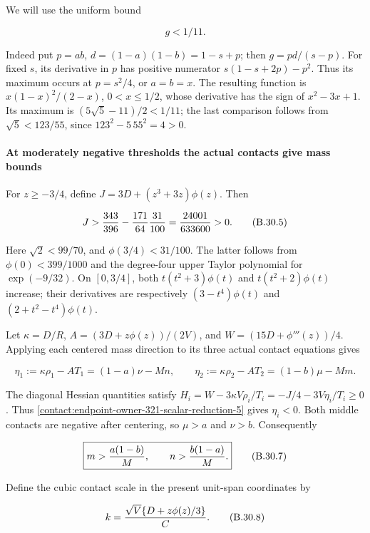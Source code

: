We will use the uniform bound

\[
 \boxed{g<1/11.}
\tag{B.30.4}\label{contact:endpoint-owner-321-scalar-reduction-4}
\]

Indeed put $p=ab$, $d=(1-a)(1-b)=1-s+p$; then $g=pd/(s-p)$.
For fixed $s$, its derivative in $p$ has positive numerator
$s(1-s+2p)-p^2$. Thus its maximum occurs at $p=s^2/4$, or $a=b=x$.
The resulting function is $x(1-x)^2/(2-x)$, $0<x\le 1/2$, whose derivative
has the sign of $x^2-3x+1$. Its maximum is
$(5\sqrt{5}-11)/2<1/11$; the last comparison follows from
$\sqrt{5}<123/55$, since $123^2-5\,55^2=4>0$.

\paragraph{At moderately negative thresholds the actual contacts give mass bounds}

For $z\ge -3/4$, define $J=3D+(z^3+3z)\phi(z)$. Then

\[
 J>{343\over396}-{171\over64}{31\over100}
 ={24001\over633600}>0.
\tag{B.30.5}\label{contact:endpoint-owner-321-scalar-reduction-5}
\]

Here $\sqrt{2}<99/70$, and $\phi(3/4)<31/100$. The latter follows from
$\phi(0)<399/1000$ and the degree-four upper Taylor polynomial for
$\exp(-9/32)$. On $[0,3/4]$, both
$t(t^2+3)\phi(t)$ and $t(t^2+2)\phi(t)$ increase; their derivatives are
respectively $(3-t^4)\phi(t)$ and $(2+t^2-t^4)\phi(t)$.

Let $\kappa=D/R$, $A=(3D+z\phi(z))/(2V)$, and
$W=(15D+\phi'''(z))/4$. Applying each centered mass direction to its three
actual contact equations gives

\[
 \eta_1:=\kappa\rho_1-AT_1=(1-a)\nu-Mn,
 \qquad
 \eta_2:=\kappa\rho_2-AT_2=(1-b)\mu-Mm.
\tag{B.30.6}\label{contact:endpoint-owner-321-scalar-reduction-6}
\]

The diagonal Hessian quantities satisfy
$H_i=W-3\kappa V \rho_i/T_i=-J/4-3V \eta_i/T_i\ge 0$.
Thus \eqref{contact:endpoint-owner-321-scalar-reduction-5} gives $\eta_i<0$. Both middle contacts are negative after centering,
so $\mu>a$ and $\nu>b$. Consequently

\[
 \boxed{m>{a(1-b)\over M},\qquad n>{b(1-a)\over M}.}
\tag{B.30.7}\label{contact:endpoint-owner-321-scalar-reduction-7}
\]

Define the cubic contact scale in the present unit-span coordinates by

\[
 k={\sqrt V\{D+z\phi(z)/3\}\over C}.
\tag{B.30.8}\label{contact:endpoint-owner-321-scalar-reduction-8}
\]

